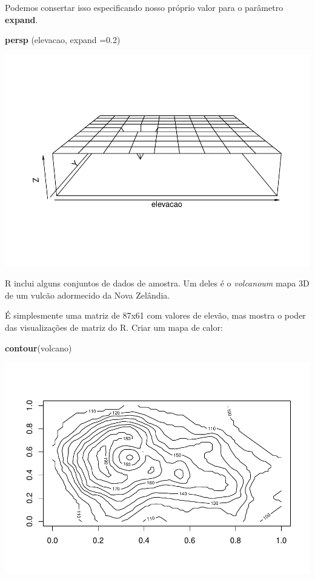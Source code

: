 \documentclass[]{book}
\newenvironment{Shaded}{\begin{snugshade}}{\end{snugshade}}
\newcommand{\DataTypeTok}[1]{\textcolor[rgb]{0.13,0.29,0.53}{#1}}
\newcommand{\FloatTok}[1]{\textcolor[rgb]{0.00,0.00,0.81}{#1}}
\newcommand{\KeywordTok}[1]{\textcolor[rgb]{0.13,0.29,0.53}{\textbf{#1}}}
\newcommand{\NormalTok}[1]{#1}
\begin{document}
Podemos consertar isso especificando nosso próprio valor para o parâmetro \textbf{expand}.

\begin{Shaded}
\begin{Highlighting}[]
\KeywordTok{persp}\NormalTok{ (elevacao, }\DataTypeTok{expand =}\FloatTok{0.2}\NormalTok{)}
\end{Highlighting}
\end{Shaded}

\includegraphics{TudodoR_files/figure-latex/unnamed-chunk-73-1.pdf}

R inclui alguns conjuntos de dados de amostra. Um deles é o \emph{volcanoum} mapa 3D de um vulcão adormecido da Nova Zelândia.

É simplesmente uma matriz de 87x61 com valores de elevão, mas mostra o poder das visualizações de matriz do R. Criar um mapa de calor:

\begin{Shaded}
\begin{Highlighting}[]
\KeywordTok{contour}\NormalTok{(volcano)}
\end{Highlighting}
\end{Shaded}

\includegraphics{TudodoR_files/figure-latex/unnamed-chunk-74-1.pdf}
\end{document}

